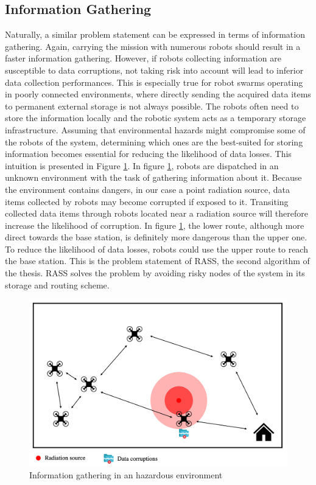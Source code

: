 \subsection{Information Gathering}
\label{sec:problemInformation}
Naturally, a similar problem statement can be expressed in terms of information gathering. Again, carrying the mission with numerous robots should result in a faster information gathering. However, if robots collecting information are susceptible to data corruptions, not taking risk into account will lead to inferior data collection performances. This is especially true for robot swarms operating in poorly connected environments, where directly sending the acquired data items to permanent external storage is not always possible. The robots often need to store the information locally and the robotic system acts as a temporary storage infrastructure. Assuming that environmental hazards might compromise some of the robots of the system, determining which ones are the best-suited for storing information becomes essential for reducing the likelihood of data losses. This intuition is presented in Figure \ref{statementRASS}. In figure \ref{statementRASS}, robots are dispatched in an unknown environment with the task of gathering information about it. Because the environment contains dangers, in our case a point radiation source, data items collected by robots may become corrupted if exposed to it. Transiting collected data items through robots located near a radiation source will therefore increase the likelihood of corruption. In figure \ref{statementRASS}, the lower route, although more direct towards the base station, is definitely more dangerous than the upper one. To reduce the likelihood of data losses, robots could use the upper route to reach the base station. This is the problem statement of RASS, the second algorithm of the thesis. RASS solves the problem by avoiding risky nodes of the system in its storage and routing scheme.

\begin{figure}[htbp]
	\centering
    \includegraphics[width=1\columnwidth]{images/statementRASS.png}
    \caption{Information gathering in an hazardous environment}
    \label{statementRASS}
\end{figure}


